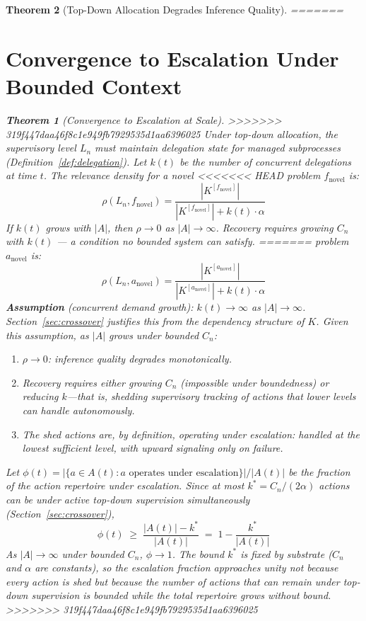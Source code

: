 \documentclass[11pt]{article}
\newtheorem{theorem}{Theorem}
\theoremstyle{definition}
\begin{document}
\begin{theorem}[Top-Down Allocation Degrades Inference Quality]
=======
\section{Convergence to Escalation Under Bounded Context}
\label{sec:topdown}

\begin{theorem}[Convergence to Escalation at Scale]
>>>>>>> 319f447daa46f8c1e949fb7929535d1aa6396025
\label{thm:topdown}
Under top-down allocation, the supervisory level $L_n$ must maintain
delegation state for managed subprocesses
(Definition~\ref{def:delegation}). Let $k(t)$ be the number of
concurrent delegations at time $t$. The relevance density for a novel
<<<<<<< HEAD
problem $f_{\mathrm{novel}}$ is:
\[
\rho(L_n, f_{\mathrm{novel}}) =
\frac{|K^{[f_{\mathrm{novel}}]}|}{|K^{[f_{\mathrm{novel}}]}| + k(t)
\cdot \alpha}
\]
If $k(t)$ grows with $|A|$, then $\rho \to 0$ as $|A| \to \infty$.
Recovery requires growing $C_n$ with $k(t)$ --- a condition no bounded
system can satisfy.
=======
problem $a_{\mathrm{novel}}$ is:
\[
\rho(L_n, a_{\mathrm{novel}}) =
\frac{|K^{[a_{\mathrm{novel}}]}|}{|K^{[a_{\mathrm{novel}}]}| + k(t)
\cdot \alpha}
\]
\textbf{Assumption} (concurrent demand growth): $k(t) \to \infty$ as
$|A| \to \infty$. Section~\ref{sec:crossover} justifies this from the
dependency structure of $K$. Given this assumption, as $|A|$ grows
under bounded $C_n$:
\begin{enumerate}
\item[(i)] $\rho \to 0$: inference quality degrades monotonically.
\item[(ii)] Recovery requires either growing $C_n$ (impossible under
   boundedness) or reducing $k$---that is, shedding supervisory
   tracking of actions that lower levels can handle autonomously.
\item[(iii)] The shed actions are, by definition, operating under
   escalation: handled at the lowest sufficient level, with upward
   signaling only on failure.
\end{enumerate}
Let $\phi(t) = |\{a \in A(t) : a \text{ operates under escalation}\}|
/ |A(t)|$ be the fraction of the action repertoire under escalation.
Since at most $k^* = C_n / (2\alpha)$ actions can be under active
top-down supervision simultaneously (Section~\ref{sec:crossover}),
\[
\phi(t) \;\geq\; \frac{|A(t)| - k^*}{|A(t)|} \;=\; 1 - \frac{k^*}{|A(t)|}
\]
As $|A| \to \infty$ under bounded $C_n$, $\phi \to 1$. The bound
$k^*$ is fixed by substrate ($C_n$ and $\alpha$ are constants), so
the escalation fraction approaches unity not because every action is
shed but because the number of actions that \emph{can} remain under
top-down supervision is bounded while the total repertoire grows
without bound.
>>>>>>> 319f447daa46f8c1e949fb7929535d1aa6396025
\end{theorem}


\end{theorem}
\end{document}
